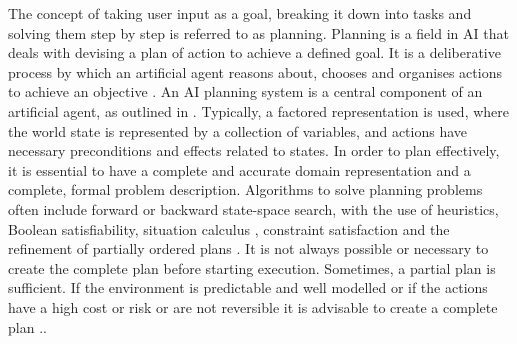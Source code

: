 \documentclass{article}
\begin{document}
The concept of taking user input as a goal, breaking it down into tasks and solving them step by step is referred to as planning. Planning is a field in AI that deals with devising a plan of action to achieve a defined goal. It is a deliberative process by which an artificial agent reasons about, chooses and organises actions to achieve an objective \cite{ghallab_nau_traverso_2016}.   An AI planning system is a central component of an artificial agent, as outlined in \cite{wooldridge_intelligent_1995}. Typically, a factored representation is used, where the world state is represented by a collection of variables, and actions have necessary preconditions and effects related to states\cite{russell_artificial_2010}. In order to plan effectively, it is essential to have a complete and accurate domain representation and a complete, formal problem description. Algorithms to solve planning problems often include forward or backward state-space search, with the use of heuristics, Boolean satisfiability, situation calculus , constraint satisfaction and the refinement of partially ordered plans \cite{russell_artificial_2010}. 
It is not always possible or necessary to create the complete plan before starting execution. Sometimes, a partial plan is sufficient. If the environment is predictable and well modelled or if the actions have a high cost or risk or are not reversible it is advisable to create a complete plan \cite{ghallab_automated_2016}..


\end{document}

